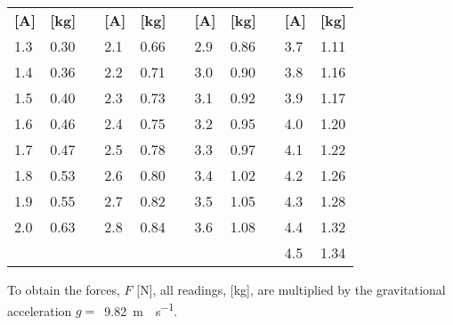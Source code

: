 \begin{table}[H]
\flushleft
\begin{tabular}{|l|l|l| l|l|l| l|l|l| l|l|}
\cline{1-2}\cline{4-5}\cline{7-8}\cline{10-11}%
  \textbf{[A]} & \textbf{[kg]} &\phantom{h}& \textbf{[A]} & \textbf{[kg]}  &\phantom{h}& \textbf{[A]} & \textbf{[kg]} &\phantom{h}& \textbf{[A]} & \textbf{[kg]} \\
\cline{1-2}\cline{4-5}\cline{7-8}\cline{10-11}%
  \num{1.3} & \num{0.30}   &   & \num{2.1} & \num{0.66} &  & \num{2.9}  & \num{0.86}  &  & \num{3.7}  & \num{1.11} \\
\cline{1-2}\cline{4-5}\cline{7-8}\cline{10-11}%
  \num{1.4} & \num{0.36}   &   & \num{2.2} & \num{0.71} &  & \num{3.0}  & \num{0.90}  &  & \num{3.8}  & \num{1.16} \\
\cline{1-2}\cline{4-5}\cline{7-8}\cline{10-11}%
  \num{1.5} & \num{0.40}   &   & \num{2.3} & \num{0.73} &  & \num{3.1}  & \num{0.92}  &  & \num{3.9}  & \num{1.17} \\
\cline{1-2}\cline{4-5}\cline{7-8}\cline{10-11}%
  \num{1.6} & \num{0.46}   &   & \num{2.4} & \num{0.75} &  & \num{3.2}  & \num{0.95}  &  & \num{4.0}  & \num{1.20} \\
\cline{1-2}\cline{4-5}\cline{7-8}\cline{10-11}%
  \num{1.7} & \num{0.47}   &   & \num{2.5} & \num{0.78} &  & \num{3.3}  & \num{0.97}  &  & \num{4.1}  & \num{1.22} \\
\cline{1-2}\cline{4-5}\cline{7-8}\cline{10-11}%
  \num{1.8} & \num{0.53}   &   & \num{2.6} & \num{0.80} &  & \num{3.4}  & \num{1.02}  &  & \num{4.2}  & \num{1.26} \\
\cline{1-2}\cline{4-5}\cline{7-8}\cline{10-11}%
  \num{1.9} & \num{0.55}   &   & \num{2.7} & \num{0.82} &  & \num{3.5}  & \num{1.05}  &  & \num{4.3}  & \num{1.28} \\
\cline{1-2}\cline{4-5}\cline{7-8}\cline{10-11}%
  \num{2.0} & \num{0.63}   &   & \num{2.8} & \num{0.84} &  & \num{3.6}  & \num{1.08}  &  & \num{4.4}  & \num{1.32} \\
\cline{1-2}\cline{4-5}\cline{7-8}\cline{10-11}%
   \multicolumn{9}{l|}{}                                                                 & \num{4.5}  & \num{1.34} \\
\cline{10-11}%
\end{tabular}
\end{table}
%
To obtain the forces, $F$ [\si{N}], all readings, [\si{kg}], are multiplied by the gravitational acceleration $g=$\nolinebreak\ \SI{9.82}{m\cdot s^{-1}}.
\pagebreak
